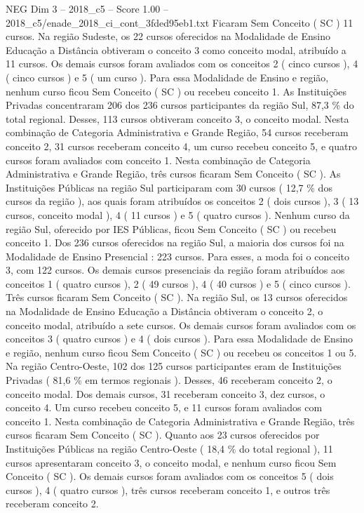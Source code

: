 \begin{textsample}{NEG Dim 3 – 2018\_c5 – Score 1.00 – 2018\_c5/enade\_2018\_ci\_cont\_3fded95eb1.txt}
Ficaram Sem Conceito ( SC ) 11 cursos.
Na região Sudeste, os 22 cursos oferecidos na Modalidade de Ensino Educação a Distância obtiveram o conceito 3 como conceito modal, atribuído a 11 cursos.
Os demais cursos foram avaliados com os conceitos 2 ( cinco cursos ), 4 ( cinco cursos ) e 5 ( um curso ).
Para essa Modalidade de Ensino e região, nenhum curso ficou Sem Conceito ( SC ) ou recebeu conceito 1.
As Instituições Privadas concentraram 206 dos 236 cursos participantes da região Sul, 87,3 \% do total regional.
Desses, 113 cursos obtiveram conceito 3, o conceito modal.
Nesta combinação de Categoria Administrativa e Grande Região, 54 cursos receberam conceito 2, 31 cursos receberam conceito 4, um curso recebeu conceito 5, e quatro cursos foram avaliados com conceito 1.
Nesta combinação de Categoria Administrativa e Grande Região, três cursos ficaram Sem Conceito ( SC ).
As Instituições Públicas na região Sul participaram com 30 cursos ( 12,7 \% dos cursos da região ), aos quais foram atribuídos os conceitos 2 ( dois cursos ), 3 ( 13 cursos, conceito modal ), 4 ( 11 cursos ) e 5 ( quatro cursos ).
Nenhum curso da região Sul, oferecido por IES Públicas, ficou Sem Conceito ( SC ) ou recebeu conceito 1.
Dos 236 cursos oferecidos na região Sul, a maioria dos cursos foi na Modalidade de Ensino Presencial : 223 cursos.
Para esses, a moda foi o conceito 3, com 122 cursos.
Os demais cursos presenciais da região foram atribuídos aos conceitos 1 ( quatro cursos ), 2 ( 49 cursos ), 4 ( 40 cursos ) e 5 ( cinco cursos ).
Três cursos ficaram Sem Conceito ( SC ).
Na região Sul, os 13 cursos oferecidos na Modalidade de Ensino Educação a Distância obtiveram o conceito 2, o conceito modal, atribuído a sete cursos.
Os demais cursos foram avaliados com os conceitos 3 ( quatro cursos ) e 4 ( dois cursos ).
Para essa Modalidade de Ensino e região, nenhum curso ficou Sem Conceito ( SC ) ou recebeu os conceitos 1 ou 5.
Na região Centro-Oeste, 102 dos 125 cursos participantes eram de Instituições Privadas ( 81,6 \% em termos regionais ).
Desses, 46 receberam conceito 2, o conceito modal.
Dos demais cursos, 31 receberam conceito 3, dez cursos, o conceito 4.
Um curso recebeu conceito 5, e 11 cursos foram avaliados com conceito 1.
Nesta combinação de Categoria Administrativa e Grande Região, três cursos ficaram Sem Conceito ( SC ).
Quanto aos 23 cursos oferecidos por Instituições Públicas na região Centro-Oeste ( 18,4 \% do total regional ), 11 cursos apresentaram conceito 3, o conceito modal, e nenhum curso ficou Sem Conceito ( SC ).
Os demais cursos foram avaliados com os conceitos 5 ( dois cursos ), 4 ( quatro cursos ), três cursos receberam conceito 1, e outros três receberam conceito 2.

\end{textsample}

